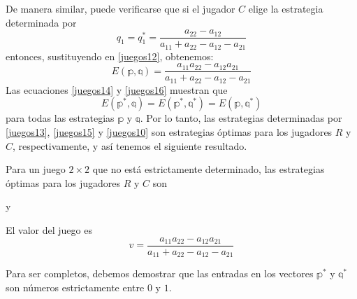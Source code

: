 De manera similar, puede verificarse que si el jugador $C$ elige la estrategia determinada por 
\begin{equation}
    q_1 = q_1^* = \frac{a_{22} - a_{12}}{a_{11} + a_{22} - a_{12} - a_{21}} \label{juegos15}
\end{equation}
entonces, sustituyendo en \eqref{juegos12}, obtenemos:
\begin{equation}
    E(\mathbb{p}, \mathbb{q}) = \frac{a_{11}a_{22} - a_{12}a_{21}}{a_{11} + a_{22} - a_{12} - a_{21}} \label{juegos16}
\end{equation}
Las ecuaciones \eqref{juegos14} y \eqref{juegos16} muestran que
\begin{equation}
    E(\mathbb{p}^*, \mathbb{q}) = E(\mathbb{p}^*, \mathbb{q}^*) = E(\mathbb{p}, \mathbb{q}^*) \label{juegos17}
\end{equation}
para todas las estrategias $\mathbb{p}$ y $\mathbb{q}$. Por lo tanto, las estrategias determinadas por \eqref{juegos13}, \eqref{juegos15} y \eqref{juegos10} son estrategias óptimas para los jugadores $R$ y $C$, respectivamente, y así tenemos el siguiente resultado.

\begin{theorem}{}{}
    Para un juego $2 \times 2$ que no está estrictamente determinado, las estrategias óptimas para los jugadores $R$ y $C$ son 
    \begin{matrizn}
    \end{matrizn}
    y
    \begin{matrizn}
    \end{matrizn}
    El valor del juego es
    $$v = \frac{a_{11}a_{22} - a_{12}a_{21}}{a_{11} + a_{22} - a_{12} - a_{21}}$$
\end{theorem}

Para ser completos, debemos demostrar que las entradas en los vectores $\mathbb{p}^*$ y $\mathbb{q}^*$ son números estrictamente entre $0$ y $1$.

